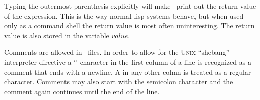 Typing the outermost parenthesis explicitly will make \lips\ print out
the return value of the expression.  This is the way normal lisp
systems behave, but when used only as a command shell the return value
is most often uninteresting.  The return value is also stored in the
variable $value$.

Comments are allowed in \lips\ files.  In order to allow for the
\textsc{Unix} ``shebang'' interpreter directive a `\lisp{\#}'
character in the first column of a line is recognized as a comment
that ends with a newline. A \lisp{\#} in any other colmn is treated as
a regular character.  Comments may also start with the semicolon
character and the comment again continues until the end of the line.
